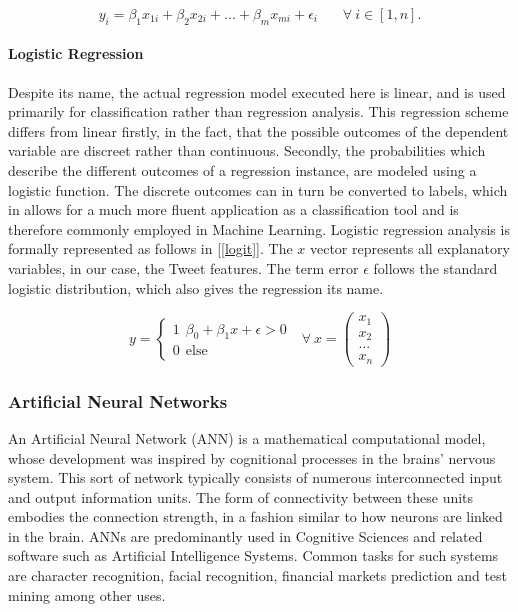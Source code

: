 	\begin{equation}
		y_i = \beta_1 x_{1i}+ \beta_2 x_{2i} + ... + \beta_m x_{mi} + \epsilon_i \ \ \ \ \ \ \ \ 
		\forall \ i \in [1,n].
		\label{lin_reg}
	\end{equation}
	
	\paragraph{Logistic Regression} Despite its name, the actual regression model executed here is linear, and is used primarily for classification rather than regression analysis. This regression scheme differs from linear firstly, in the fact, that the possible outcomes of the dependent variable are discreet rather than continuous. Secondly, the probabilities which describe the different outcomes of a regression instance, are modeled using a logistic function. The discrete outcomes can in turn be converted to labels, which in allows for a much more fluent application as a classification tool and is therefore commonly employed in  Machine Learning. Logistic regression analysis is formally represented as follows in  [\ref{logit}]. The $x$ vector represents all explanatory variables, in our case, the Tweet features. The term error $\epsilon$ follows the standard logistic distribution, which also gives the regression its name. 
	
	\begin{equation}
	y = 
	\begin{cases}
	1 \ \  \beta_0 + \beta_1 x + \epsilon > 0 \\
	0 \ \  \text{else } 
	\end{cases} \text{         } \forall \  x = 
	\begin{pmatrix}x_1\\x_2\\...\\x_n \end{pmatrix}
	\label{logit}
	\end{equation}
	
	
	
	\subsubsection{Artificial Neural Networks}
		An Artificial Neural Network (ANN) \cite{mcculloch1943logical} is a mathematical computational model, whose development was inspired by cognitional processes in the brains' nervous system. This sort of network typically consists of numerous interconnected input and output information units. The form of connectivity between these units embodies the connection strength, in a fashion similar to how neurons are linked in the brain. ANNs are predominantly used in Cognitive Sciences and related software such as Artificial Intelligence Systems. Common tasks for such systems are character recognition, facial recognition, financial markets prediction and test mining among other uses.
		
